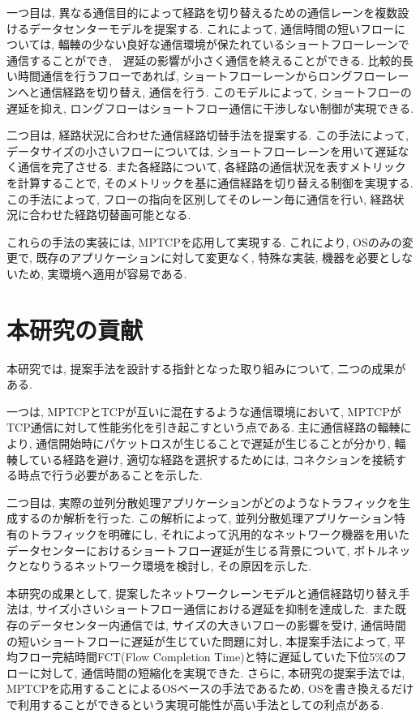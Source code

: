 一つ目は, 異なる通信目的によって経路を切り替えるための通信レーンを複数設けるデータセンターモデルを提案する. 
これによって, 通信時間の短いフローについては,
輻輳の少ない良好な通信環境が保たれているショートフローレーンで通信することができ,　遅延の影響が小さく通信を終えることができる.
比較的長い時間通信を行うフローであれば, ショートフローレーンからロングフローレーンへと通信経路を切り替え, 通信を行う. 
このモデルによって, ショートフローの遅延を抑え, ロングフローはショートフロー通信に干渉しない制御が実現できる. 

二つ目は, 経路状況に合わせた通信経路切替手法を提案する. 
この手法によって, データサイズの小さいフローについては, ショートフローレーンを用いて遅延なく通信を完了させる. 
また各経路について, 各経路の通信状況を表すメトリックを計算することで, そのメトリックを基に通信経路を切り替える制御を実現する. 
この手法によって, フローの指向を区別してそのレーン毎に通信を行い, 経路状況に合わせた経路切替画可能となる. 

これらの手法の実装には, MPTCPを応用して実現する. 
これにより, OSのみの変更で, 既存のアプリケーションに対して変更なく, 特殊な実装, 機器を必要としないため, 
実環境へ適用が容易である. 

\section{本研究の貢献}
本研究では, 提案手法を設計する指針となった取り組みについて, 二つの成果がある. 

一つは, MPTCPとTCPが互いに混在するような通信環境において, MPTCPがTCP通信に対して性能劣化を引き起こすという点である. 
主に通信経路の輻輳により, 通信開始時にパケットロスが生じることで遅延が生じることが分かり, 輻輳している経路を避け, 適切な経路を選択するためには,
コネクションを接続する時点で行う必要があることを示した. 

二つ目は, 実際の並列分散処理アプリケーションがどのようなトラフィックを生成するのか解析を行った. 
この解析によって, 並列分散処理アプリケーション特有のトラフィックを明確にし, 
それによって汎用的なネットワーク機器を用いたデータセンターにおけるショートフロー遅延が生じる背景について, ボトルネックとなりうるネットワーク環境を検討し,
その原因を示した.

本研究の成果として, 提案したネットワークレーンモデルと通信経路切り替え手法は, サイズ小さいショートフロー通信における遅延を抑制を達成した. 
また既存のデータセンター内通信では, サイズの大きいフローの影響を受け, 通信時間の短いショートフローに遅延が生じていた問題に対し, 本提案手法によって,
平均フロー完結時間FCT(Flow Completion Time)と特に遅延していた下位5\%のフローに対して, 通信時間の短縮化を実現できた. 
さらに, 本研究の提案手法では, MPTCPを応用することによるOSベースの手法であるため,
OSを書き換えるだけで利用することができるという実現可能性が高い手法としての利点がある. 

